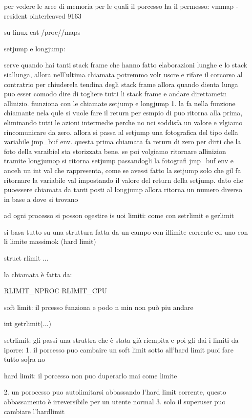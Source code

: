 per vedere le aree di memoria per le quali il porcesso ha il permesso:
vmmap -resident ointerleaved 9163

su linux 
cat /proc/$$/maps


setjump e longjump:

serve quando hai tanti stack frame che hanno fatto elaborazioni lunghe e lo stack siallunga, allora nell'ultima chiamata potremmo volr uscre e rifare il corcorso al contratrio per chiuderela tendina degli stack frame allora quando dienta lunga puo esser comodo dire di togliere tutti li stack frame e andare direttametn allinizio. fiunziona con le chiamate setjump e longjump
1. la fa nella funzione chiamante nela qule si vuole fare il return per esmpio di puo ritorna alla prima, eliminando tutti le azioni intermedie perche no nci soddisfa un valore e vlgiamo rincomunicare da zero. allora si passa al setjump una fotografica del tipo della variabile jmp\_buf env. questa prima chiamata fa return di zero per dirti che la foto della varaibiel sta storizzata bene. se poi volgiamo ritornare allinizion tramite longjumop si ritorna setjump passandogli la fotografi jmp\_buf env e anceh un int val che rappresenta, come se avessi fatto la setjump solo che gil fa ritornare la variabile val impostando il valore del return della setjump. dato che puoessere chiamata da tanti posti al longjump allora ritorna un numero diverso in base a dove si trovano


ad ogni processo si posson ogestire is uoi limiti: come con setrlimit e gerlimit

si basa tutto su una struttura fatta da un campo con illimite corrente ed uno con li limite massimok (hard limit)

struct rlimit{
...
}

la chiamata è fatta da: 

RLIMIT_NPROC
RLIMIT_CPU


soft limit: il prcesso funziona e podo n min non può piu andare

int getrlimit(...)

setrlimit: gli passi una struttra che è stata già riempita e poi gli dai i limiti da iporre:
1. il porcesso puo cambaire un soft limit sotto all'hard limit puoi fare tutto so[ra no


hard limit: il porcesso non puo duperarlo mai come limite 

2. un porocesso puo autolimitarsi abbassando l'hard limit corrente, questo abbassamento è irreversibile per un utente normal
3. solo il superuser puo cambiare l'hardlimit

